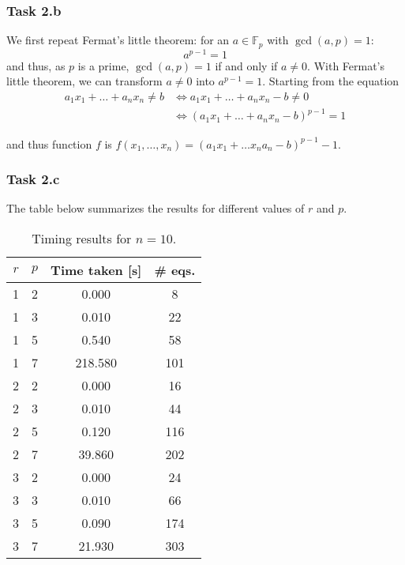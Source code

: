 \documentclass{article}
\begin{document}
\subsubsection*{Task 2.b}

We first repeat Fermat's little theorem: for an $a \in \mathbb{F}_p$ with
$\gcd(a, p) = 1$:
\begin{equation}
  a^{p-1} = 1
\end{equation} 
and thus, as $p$ is a prime, $\gcd(a, p) = 1$ if and only if $a \neq 0$. With
Fermat's little theorem, we can transform $a \neq 0$ into $a^{p - 1} = 1$.
Starting from the equation 
\begin{equation}
  \begin{split}
    a_1 x_1 + \dots + a_n x_n \neq b &\Leftrightarrow a_1 x_1 + \dots + a_n x_n - b
    \neq 0 \\
                                     &\Leftrightarrow  (a_1 x_1 + \dots + a_n
                                     x_n - b)^{p-1} = 1
  \end{split}
\end{equation} 

and thus function $f$ is $f(x_1, \dots, x_n) = (a_1x_1 + \dots x_n a_n -b)^{p-1}
- 1$.

\clearpage

\subsubsection*{Task 2.c}

The table below summarizes the results for different values of $r$ and $p$.

\begin{table}[htpb]
  \centering
  \caption{Timing results for $n = 10$.}
  \label{tab:label}
  \begin{tabular}{cccc}
  
    \toprule
    $r$ & $p$ & Time taken [s]  & \# eqs.\\
    \midrule
    1 & 2 & 0.000 & 8\\
    \midrule
    1 & 3 & 0.010 & 22\\
    \midrule
    1 & 5 & 0.540 & 58\\
    \midrule
    1 & 7 & 218.580 & 101\\
    \midrule
    2 & 2 & 0.000 & 16 \\
    \midrule
    2 & 3 & 0.010 & 44 \\
    \midrule
    2 & 5 & 0.120 & 116\\
    \midrule
    2 & 7 & 39.860 & 202\\
    \midrule
    3 & 2 & 0.000 & 24\\
    \midrule
    3 & 3 & 0.010 & 66 \\
    \midrule
    3 & 5 & 0.090 & 174 \\
    \midrule
    3 & 7 & 21.930 & 303\\
    \bottomrule
  \end{tabular}
\end{table}
\end{document}
